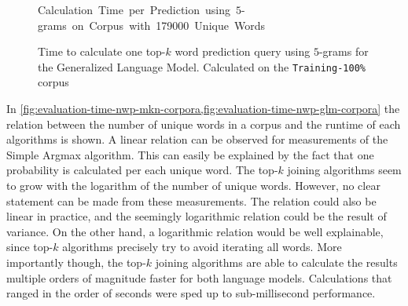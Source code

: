 \begin{figure}[p!]
  \small
  \vspace{-3ex}
  \begin{center}
    \mbox{\hspace{-0.8cm}Calculation Time per Prediction using $5$-grams on Corpus with \num{179000} Unique Words}
  \end{center}

  \vspace{-0.2cm}
  \hspace{-0.16\textwidth}
  \normalsize
  \caption{Time to calculate one top-$k$ word prediction query using $5$-grams
    for the Generalized Language Model. Calculated on the
    \texttt{Training-100\%} corpus}
  \label{fig:evaluation-time-nwp-glm-predictions}
\end{figure}

In \cref{fig:evaluation-time-nwp-mkn-corpora,fig:evaluation-time-nwp-glm-corpora}
the relation between the number of unique words in a corpus and the runtime of
each algorithms is shown.
A linear relation can be observed for measurements of the Simple Argmax
algorithm.
This can easily be explained by the fact that one probability is calculated per
each unique word.
The top-$k$ joining algorithms seem to grow with the logarithm of the number of
unique words.
However, no clear statement can be made from these measurements.
The relation could also be linear in practice, and the seemingly logarithmic
relation could be the result of variance.
On the other hand, a logarithmic relation would be well explainable, since
top-$k$ algorithms precisely try to avoid iterating all words.
More importantly though, the top-$k$ joining algorithms are able to calculate
the results multiple orders of magnitude faster for both language models.
Calculations that ranged in the order of seconds were sped up to
sub-millisecond performance.

